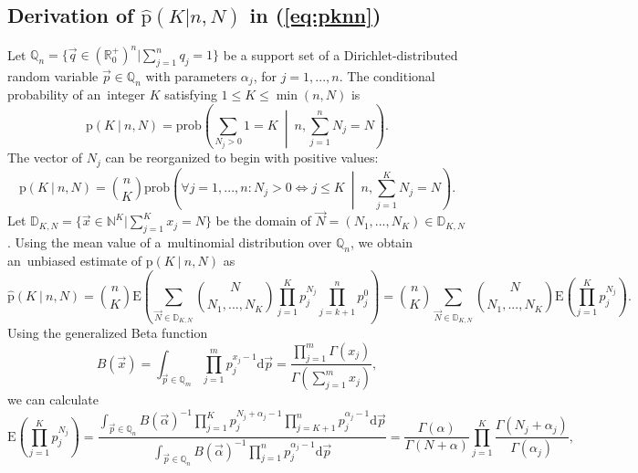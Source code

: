 \subsection {Derivation of $\hat{\mathrm{p}}(K|n,N)$ in (\ref{eq:pknn})}
\label{subsec:app1}
Let $\mathbb{Q}_{n} = \{ \vec{q} \in (\mathbb{R}_{0}^{+})^{n} | \sum_{j=1}^{n}q_{j} = 1 \}$ be a support set of a Dirichlet-distributed random variable $\vec{p} \in \mathbb{Q}_{n}$ with parameters $\alpha_j$, for $j = 1,...,n$. The conditional probability of an~integer $K$ satisfying $1 \le K \le \min(n,N)$ is 
\begin{equation} 
\label{eq:probpkn}
\text{p}(K \: | \: n,N) = \text{prob}\left(\sum_{N_{j}>0} 1 = K \: \middle| \: n, \sum_{j=1}^{n}N_{j} = N\right).
\end{equation}
The vector of $N_{j}$ can be reorganized to begin with positive values:
\begin{equation} 
\label{eq:probbinom}
\text{p}(K \: | \: n,N) = {n \choose K}\text{prob}\left( \forall j=1,...,n : N_{j} > 0 \Leftrightarrow j \le K \: \middle| \: n, \sum_{j=1}^{K}N_{j}=N\right).
\end{equation}
Let $\mathbb{D}_{K,N} = \{ \vec{x} \in \mathbb{N}^K | \sum_{j=1}^{K}x_{j} = N \}$ be the domain of $\vec{N} = (N_{1},...,N_{K}) \in \mathbb{D}_{K,N}$. Using the mean value of a~multinomial distribution over $\mathbb{Q}_{n}$, we obtain an~unbiased estimate of $\text{p}(K \: | \: n,N)$ as
\begin{equation} 
\label{eq:probbinomexp}
\mathrm{\hat{p}}(K \: | \: n,N) = {n \choose K} \text{E}\left(\sum_{\vec{N} \in \mathbb{D}_{K,N}} {N \choose N_{1},...,N_{K}} \prod_{j=1}^{K}p_{j}^{N_{j}} \prod_{j=k+1}^{n}p_{j}^{0} \right) = {n \choose K} \sum_{\vec{N} \in \mathbb{D}_{K,N}} {N \choose N_{1},...,N_{K}} \text{E}\left( \prod_{j=1}^{K}p_{j}^{N_{j}}\right).
\end{equation}
Using the generalized Beta function
\begin{equation} 
\label{eq:betafce}
B(\vec{x}) = \int_{\vec{p} \in \mathbb{Q}_{m}} \prod_{j=1}^{m} p_{j}^{x_{j}-1} \text{d}\vec{p} = \frac{\prod_{j=1}^{m} \Gamma(x_{j})}{\Gamma(\sum_{j=1}^{m}x_{j})},
\end{equation}
we can calculate
\begin{equation} 
\label{eq:expprod}
\text{E}\left( \prod_{j=1}^{K}p_{j}^{N_{j}} \right) = \frac{\int_{\vec{p} \in \mathbb{Q}_{n}} {B(\vec{\alpha})}^{-1} \prod_{j=1}^{K} p_{j}^{N_{j}+\alpha_{j}-1}  \prod_{j=K+1}^{n} p_{j}^{\alpha_{j}-1} \text{d}\vec{p}}{\int_{\vec{p} \in \mathbb{Q}_{n}}  {B(\vec{\alpha})}^{-1}\prod_{j=1}^{n} p_{j}^{\alpha_{j}-1} \text{d}\vec{p}} = \frac{\Gamma(\alpha)}{\Gamma(N+\alpha)} \prod_{j=1}^{K} \frac{\Gamma(N_{j}+\alpha_j)}{\Gamma(\alpha_j)},
\end{equation}
